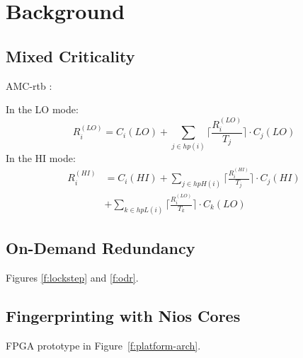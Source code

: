 
\chapter{Background} %

\label{c:background} %


\section{Mixed Criticality}
AMC-rtb \cite{baruah2011response}:

In the LO mode:
\begin{equation}
R_i^{(LO)}= C_i(LO)+\sum_{j \in hp(i)}\Big\lceil\frac{R_i^{(LO)}}{T_j}\Big\rceil \cdot C_j(LO)
\label{eq:mode1}
\end{equation}
In the HI mode:
\begin{equation}
\begin{aligned}
R_i^{(HI)} &  = C_i(HI)+\sum_{j \in hpH(i)}\Big\lceil\frac{R_i^{(HI)}}{T_j}\Big\rceil \cdot C_j(HI) \\
&  +\sum_{k \in hpL(i)}\Big\lceil\frac{R_i^{(LO)}}{T_k}\Big\rceil \cdot C_k(LO)
\end{aligned}
\end{equation}



\section{On-Demand Redundancy}
Figures \ref{f:lockstep} and \ref{f:odr}.


\section{Fingerprinting with Nios Cores}

FPGA prototype in Figure~\ref{f:platform-arch}.

